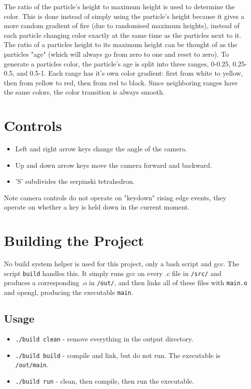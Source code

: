 \documentclass[10pt]{article}
\begin{document}
    The ratio of the particle's height to maximum height is used to determine the color. This is done instead of simply using the particle's height because it gives a more random gradient of fire (due to randomised maximum heights), instead of each particle changing color exactly at the same time as the particles next to it. The ratio of a particles height to its maximum height can be thought of as the particles "age" (which will always go from zero to one and reset to zero). To generate a particles color, the particle's age is split into three ranges, 0-0.25, 0.25-0.5, and 0.5-1. Each range has it's own color gradient:  first from white to yellow, then from yellow to red, then from red to black. Since neighboring ranges have the same colors, the color transition is always smooth.
    
    \section{Controls}
    \begin{itemize}
        \item Left and right arrow keys change the angle of the camera.
        \item Up and down arrow keys move the camera forward and backward.
        \item 'S' subdivides the serpinski tetrahedron.
    \end{itemize}
    Note camera controls do not operate on "keydown" rising edge events, they operate on whether a key is held down in the current moment.

    \section{Building the Project}
    No build system helper is used for this project, only a bash script and gcc. The script \verb|build| handles this. It simply runs gcc on every .c file in \verb|/src/| and produces a corresponding .o in \verb|/out/|, and then links all of these files with \verb|main.o| and opengl, producing the executable \verb|main|.
    \subsection{Usage}
    \begin{itemize}
        \item \verb|./build clean| - remove everything in the output directory.
        \item \verb|./build build| - compile and link, but do not run. The executable is \verb|/out/main|.
        \item \verb|./build run| - clean, then compile, then run the executable.
    \end{itemize}
\end{document}
